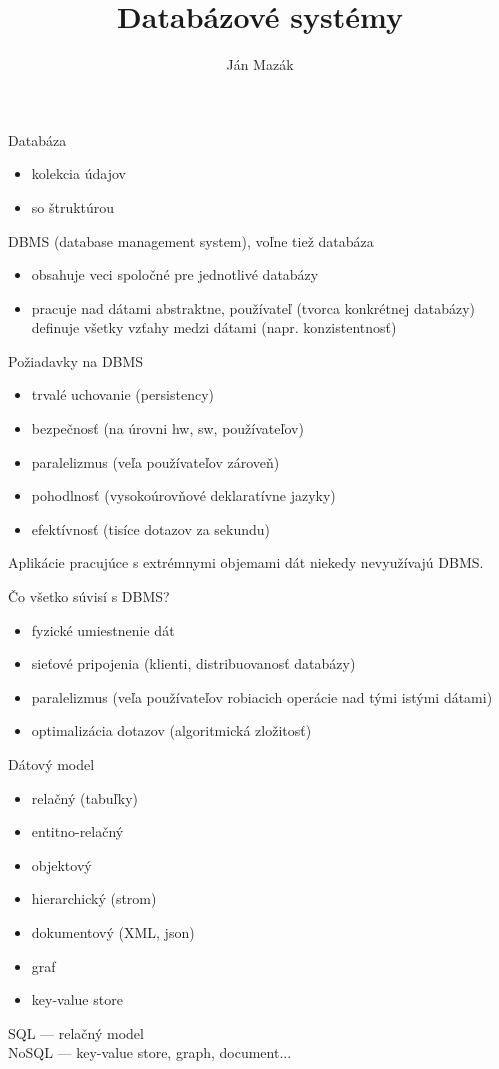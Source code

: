 \documentclass[12pt]{beamer}
\title{Databázové systémy}
\author{Ján Mazák}
\institute{FMFI UK Bratislava}
\date{}
\begin{document}
\frame{\titlepage}

\begin{frame}
Databáza
\begin{itemize}
\item kolekcia údajov
\item so štruktúrou
\end{itemize}
\vskip 1cm
\pause

DBMS (database management system), voľne tiež databáza
\begin{itemize}
\item obsahuje veci spoločné pre jednotlivé databázy
\item pracuje nad dátami abstraktne, používateľ (tvorca konkrétnej databázy) definuje všetky vzťahy medzi dátami (napr. konzistentnosť)
\end{itemize}
\end{frame}

\begin{frame}
Požiadavky na DBMS
\begin{itemize}
\item trvalé uchovanie (persistency)
\item bezpečnosť (na úrovni hw, sw, používateľov)
\item paralelizmus (veľa používateľov zároveň)
\item pohodlnosť (vysokoúrovňové deklaratívne jazyky)
\item efektívnosť (tisíce dotazov za sekundu)
\end{itemize}
\pause
Aplikácie pracujúce s extrémnymi objemami dát niekedy nevyužívajú DBMS.
\end{frame}

\begin{frame}
Čo všetko súvisí s DBMS?
\begin{itemize}
\item fyzické umiestnenie dát
\item sieťové pripojenia (klienti, distribuovanosť databázy)
\item paralelizmus (veľa používateľov robiacich operácie nad tými istými dátami)
\item optimalizácia dotazov (algoritmická zložitosť)
\end{itemize}
\pause
\end{frame}

\begin{frame}
Dátový model
\begin{itemize}
\item relačný (tabuľky)
\item entitno-relačný
\item objektový
\item hierarchický (strom)
\item dokumentový (XML, json)
\item graf
\item key-value store
\end{itemize}
SQL --- relačný model\\
NoSQL --- key-value store, graph, document...
\end{frame}
\end{document}
